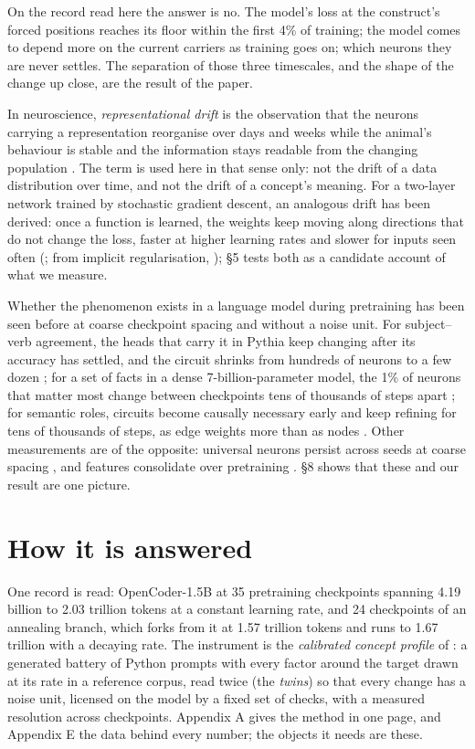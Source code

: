 \documentclass{article}
\begin{document}
On the record read here the answer is no. The model's loss at the construct's forced positions reaches its floor within the first 4\% of training; the model comes to depend more on the current carriers as training goes on; which neurons they are never settles. The separation of those three timescales, and the shape of the change up close, are the result of the paper.

In neuroscience, \emph{representational drift} is the observation that the neurons carrying a representation reorganise over days and weeks while the animal's behaviour is stable and the information stays readable from the changing population \citep{driscoll2017,rule2019,rule2020,schoonover2021}. The term is used here in that sense only: not the drift of a data distribution over time, and not the drift of a concept's meaning. For a two-layer network trained by stochastic gradient descent, an analogous drift has been derived: once a function is learned, the weights keep moving along directions that do not change the loss, faster at higher learning rates and slower for inputs seen often (\citealp{pashakhanloo2023}; from implicit regularisation, \citealp{ratzon2024}); \S5 tests both as a candidate account of what we measure.

Whether the phenomenon exists in a language model during pretraining has been seen before at coarse checkpoint spacing and without a noise unit. For subject--verb agreement, the heads that carry it in Pythia keep changing after its accuracy has settled, and the circuit shrinks from hundreds of neurons to a few dozen \citep{yao2026b}; for a set of facts in a dense 7-billion-parameter model, the 1\% of neurons that matter most change between checkpoints tens of thousands of steps apart \citep{wang2026}; for semantic roles, circuits become causally necessary early and keep refining for tens of thousands of steps, as edge weights more than as nodes \citep{aljaafari2026}. Other measurements are of the opposite: universal neurons persist across seeds at coarse spacing \citep{nandan2025,gurnee2024}, and features consolidate over pretraining \citep{bayazit2026}. \S8 shows that these and our result are one picture.

\section{How it is answered}

One record is read: OpenCoder-1.5B at 35 pretraining checkpoints spanning 4.19 billion to 2.03 trillion tokens at a constant learning rate, and 24 checkpoints of an annealing branch, which forks from it at 1.57 trillion tokens and runs to 1.67 trillion with a decaying rate. The instrument is the \emph{calibrated concept profile} of \citet{wilam2026}: a generated battery of Python prompts with every factor around the target drawn at its rate in a reference corpus, read twice (the \emph{twins}) so that every change has a noise unit, licensed on the model by a fixed set of checks, with a measured resolution across checkpoints. Appendix A gives the method in one page, and Appendix E the data behind every number; the objects it needs are these.
\end{document}
